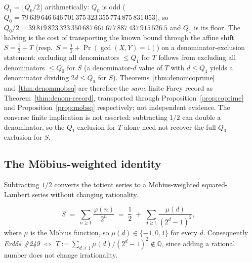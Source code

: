 \begin{rem}
$Q_1 = \lfloor Q_0/2 \rfloor$ arithmetically: $Q_0$ is odd
($Q_0 = 79\,639\,646\,646\,701\,375\,323\,355\,774\,875\,831\,053$), so
$Q_0/2 = 39\,819\,823\,323\,350\,687\,661\,677\,887\,437\,915\,526.5$ and
$Q_1$ is its floor. The halving is the cost of transporting the known bound
through the affine shift
$S = \tfrac12 + T$ (resp.\ $S = \tfrac12 + \Pr(\gcd(X,Y)=1)$) on a
denominator-exclusion statement: excluding all denominators $\le Q_1$ for $T$
follows from excluding all denominators $\le Q_0$ for $S$ (a denominator-$d$
value of $T$ with $d\le Q_1$ yields a
denominator dividing $2d\le Q_0$ for $S$). Theorems~\ref{thm:denomcoprime}
and~\ref{thm:denommobsq} are therefore the \emph{same} finite Farey record as
Theorem~\ref{thm:denom-record}, transported through Proposition~\ref{prop:coprime}
and Proposition~\ref{prop:mobsq} respectively; not independent evidence.
The converse finite implication is not asserted: subtracting $1/2$ can double
a denominator, so the $Q_1$ exclusion for $T$ alone need not recover the full
$Q_0$ exclusion for $S$.
\end{rem}

\subsection{The M\"obius-weighted identity}
\label{ssec:mobius}

Subtracting $1/2$ converts the totient series to a M\"obius-weighted
squared-Lambert series without changing rationality.

\begin{prop}
\label{prop:mobsq}
\[
S \;=\; \sum_{n\ge1}\frac{\varphi(n)}{2^n} \;=\; \frac12 \;+\; \sum_{d\ge1}\frac{\mu(d)}{(2^d-1)^2},
\]
where $\mu$ is the M\"obius function, so $\mu(d)\in\{-1,0,1\}$ for every $d$.
Consequently \emph{Erd\H{o}s \#249 $\iff$ $T:=\sum_{d\ge1}\mu(d)/(2^d-1)^2 \notin \mathbb{Q}$},
since adding a rational number does not change irrationality.
\end{prop}

